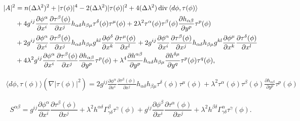 \documentclass[12pt]{article}
\begin{document}
\begin{align*}
|A|^{2} &=  n (\Delta \lambda^{2})^{2} + |\tau(\phi)|^{4} -
2(\Delta\lambda^{2})|\tau(\phi)|^{2} + 4 (\Delta\lambda^{2})
\operatorname{div}{\langle d\phi , \tau(\phi)\rangle} \label{eq10}\\
& + 4 g^{ij} \frac{\partial \phi^{\alpha}}{\partial x^{i}} \frac{\partial
\tau^{\beta}(\phi)}{\partial x^{j}} h_{\alpha\delta}h_{\beta\mu}
\tau^{\delta}(\phi)\tau^{\mu}(\phi)
  + 2 \lambda^{2} \tau^{\alpha}(\phi)\tau^{\beta}(\phi)
\frac{\partial h_{\alpha\beta}}{\partial y^{p}} \tau^{p}(\phi) \notag\\
& + 2 g^{ij} \frac{\partial \phi^{\alpha}}{\partial x^{i}} \frac{\partial
\tau^{\beta}(\phi)}{\partial x^{j}} h_{\alpha\delta}h_{\beta\mu} g^{kl}
\frac{\partial \phi^{\delta}}{\partial x^{k}} \frac{\partial
\tau^{\mu}(\phi)}{\partial x^{l}} +  2 g^{ij} \frac{\partial \phi^{\alpha}}{\partial
x^{i}} \frac{\partial \tau^{\beta}(\phi)}{\partial x^{j}}
h_{\alpha\delta}h_{\beta\mu} g^{kl} \frac{\partial \phi^{\mu}}{\partial x^{k}}
\frac{\partial
\tau^{\delta}(\phi)}{\partial x^{l}} \notag\\
& + 4 \lambda^{2} g^{ij} \frac{\partial \phi^{\alpha}}{\partial x^{i}} \frac{\partial
\tau^{\beta}(\phi)}{\partial x^{j}} \frac{\partial h_{\alpha\beta}}{\partial y^{p}}
\tau^{p}(\phi) + \lambda^{4} \frac{\partial h^{\alpha\beta}}{\partial y^{p}}
h_{\alpha\delta}h_{\beta\mu} \frac{\partial h^{\delta\mu}}{\partial y^{q}}
\tau^{p}(\phi) \tau^{q}(\phi) , \notag
\end{align*}

\begin{align*}
\langle d\phi, \tau(\phi) \rangle (\nabla |\tau(\phi)|^{2}) = 2 g^{ij} \frac{\partial
\phi^{\alpha}}{\partial x^{i}} \frac{\partial \tau^{\beta}(\phi)}{\partial x^{j}}
h_{\alpha\delta}h_{\beta\mu} \tau^{\delta}(\phi)\tau^{\mu}(\phi)
  +  \lambda^{2} \tau^{\alpha}(\phi)\tau^{\beta}(\phi)
\frac{\partial h_{\alpha\beta}}{\partial y^{p}} \tau^{p}(\phi)
\end{align*}

$$ S^{\alpha\beta} =  g^{ij} \frac{\partial \phi^{\alpha}}{\partial x^{i}}
\frac{\partial \tau^{\beta}(\phi)}{\partial x^{j}} + \lambda^{2} h^{\alpha\delta}
\Gamma^{\beta}_{\gamma\delta} \tau^{\gamma}(\phi)
  + g^{ij} \frac{\partial \phi^{\beta}}{\partial x^{i}}
\frac{\partial \tau^{\alpha}(\phi)}{\partial x^{j}} + \lambda^{2} h^{\beta\delta}
\Gamma^{\alpha}_{\gamma\delta} \tau^{\gamma}(\phi) .
$$
\end{document}
